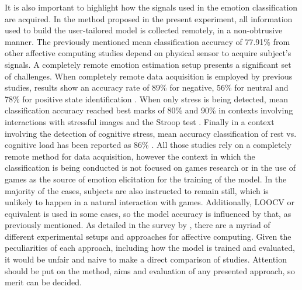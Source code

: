 It is also important to highlight how the signals used in the emotion classification are acquired. In the method proposed in the present experiment, all information used to build the user-tailored model is collected remotely, in a non-obtrusive manner. The previously mentioned mean classification accuracy of 77.91\% from other affective computing studies depend on physical sensor to acquire subject's signals. A completely remote emotion estimation setup presents a significant set of challenges. When completely remote data acquisition is employed by previous studies, results show an accuracy rate of 89\% for negative, 56\% for neutral and 78\% for positive state identification \parencite{mental}. When only stress is being detected, mean classification accuracy reached best marks of 80\% and 90\% in contexts involving interactions with stressful images and the Stroop test \parencite{giannakakis2017stress}. Finally in a context involving the detection of cognitive stress, mean accuracy classification of rest vs. cognitive load has been reported as 86\% \parencite{mcduffcogcam}. All those studies rely on a completely remote method for data acquisition, however the context in which the classification is being conducted is not focused on games research or in the use of games as the source of emotion elicitation for the training of the model. In the majority of the cases, subjects are also instructed to remain still, which is unlikely to happen in a natural interaction with games. Additionally, LOOCV or equivalent is used in some cases, so the model accuracy is influenced by that, as previously mentioned. As detailed in the survey by \textcite{moghimi2017affective}, there are a myriad of different experimental setups and approaches for affective computing. Given the peculiarities of each approach, including how the model is trained and evaluated, it would be unfair and naive to make a direct comparison of studies. Attention should be put on the method, aims and evaluation of any presented approach, so merit can be decided.

